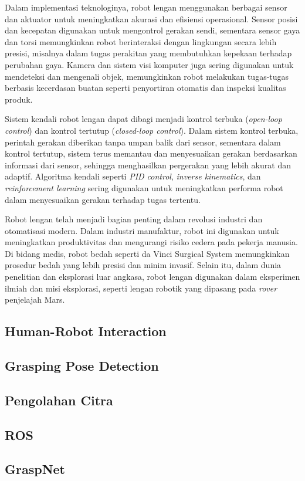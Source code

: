 Dalam implementasi teknologinya, robot lengan menggunakan berbagai sensor dan aktuator untuk
meningkatkan akurasi dan efisiensi operasional\parencite{ZhenXie_lbrgar}. Sensor posisi dan kecepatan digunakan untuk
mengontrol gerakan sendi, sementara sensor gaya dan torsi memungkinkan robot berinteraksi
dengan lingkungan secara lebih presisi, misalnya dalam tugas perakitan yang membutuhkan kepekaan
terhadap perubahan gaya. Kamera dan sistem visi komputer juga sering digunakan untuk mendeteksi
dan mengenali objek, memungkinkan robot melakukan tugas-tugas berbasis kecerdasan buatan
seperti penyortiran otomatis dan inspeksi kualitas produk.

Sistem kendali robot lengan dapat dibagi menjadi kontrol terbuka (\emph{open-loop control}) dan
kontrol tertutup (\emph{closed-loop control}). Dalam sistem kontrol terbuka, perintah gerakan diberikan
tanpa umpan balik dari sensor, sementara dalam kontrol tertutup, sistem terus memantau dan
menyesuaikan gerakan berdasarkan informasi dari sensor, sehingga menghasilkan pergerakan
yang lebih akurat dan adaptif. Algoritma kendali seperti \emph{PID control}, \emph{inverse kinematics},
dan \emph{reinforcement learning} sering digunakan untuk meningkatkan performa robot dalam
menyesuaikan gerakan terhadap tugas tertentu.

Robot lengan telah menjadi bagian penting dalam revolusi industri dan otomatisasi modern.
Dalam industri manufaktur, robot ini digunakan untuk meningkatkan produktivitas dan
mengurangi risiko cedera pada pekerja manusia. Di bidang medis, robot bedah seperti
da Vinci Surgical System memungkinkan prosedur bedah yang lebih presisi dan minim invasif.
Selain itu, dalam dunia penelitian dan eksplorasi luar angkasa, robot lengan digunakan
dalam eksperimen ilmiah dan misi eksplorasi, seperti lengan robotik yang dipasang pada \emph{rover} penjelajah Mars.

\subsection{Human-Robot Interaction}

\subsection{Grasping Pose Detection}

\subsection{Pengolahan Citra}

\subsection{ROS}

\subsection{GraspNet}